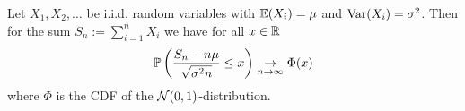\begin{theorem*}
  Let \(X_1, X_2, \ldots\) be i.i.d. random variables with \(\E(X_i) = \mu\) and \(\Var(X_i) = \sigma^2\). Then for the sum \(S_n := \sum_{i=1}^n X_i\) we have for all \(x \in \R\)
  \[\P\left(\frac{S_n - n \mu}{\sqrt{\sigma^2n}} \leq x\right) \underset{n \to \infty}{\to} \Phi(x)\]
  where \(\Phi\) is the CDF of the \(\Normal(0, 1)\)-distribution.
\end{theorem*}
